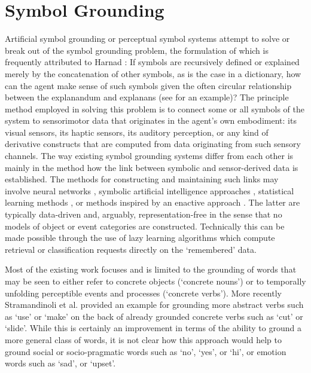 \section{Symbol Grounding}
Artificial symbol grounding or perceptual symbol systems \cite{Barsalou1999} attempt to solve or break out of the symbol grounding problem, the formulation of
which is frequently attributed to Harnad \cite{Harnad1990}: If symbols are recursively defined or explained merely by the concatenation of other symbols, as is the case 
in a dictionary, how can the agent make sense of such symbols given the often circular relationship between the explanandum and explanans (see \cite{Roy2005} for 
an example)? The principle method employed in solving this problem is to connect some or all symbols of the system to sensorimotor data that originates in the agent's own 
embodiment: its visual sensors, its haptic sensors, its auditory perception, or any kind of derivative constructs that are computed from data originating from such sensory
channels. The way existing symbol grounding systems differ from each other is mainly in the method how the link between symbolic and sensor-derived data is established. 
The methods for constructing and maintaining such links may involve neural networks \cite{Sugita2005,Cangelosi2010}, symbolic artificial intelligence approaches 
\cite{Siskind2001,Dominey2005,Steels2003a}, statistical learning methods \cite{Stepanova2018}, or methods inspired by an enactive approach \cite{Nehaniv2013,Lyon2016}. 
The latter are typically data-driven and, arguably, representation-free in the sense that no models of object or event categories are constructed. Technically this 
can be made possible through the use of lazy learning algorithms \cite{Aha1997} which compute retrieval or classification requests directly on the `remembered' data.

Most of the existing work focuses and is limited to the grounding of words that may be seen to either refer to concrete objects (`concrete nouns') or to temporally unfolding 
perceptible events and processes (`concrete verbs'). More recently Stramandinoli et al. \cite{Stramandinoli2017} provided an example for grounding more abstract verbs
such as `use' or `make' on the back of already grounded concrete verbs such as `cut' or `slide'. While this is certainly an improvement in terms of the ability to ground a 
more general class of words, it is not clear how this approach would help to ground social or socio-pragmatic words such as `no', `yes', or `hi', or emotion words such
as `sad', or `upset'.


